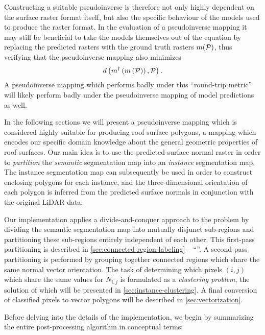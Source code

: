 Constructing a suitable pseudoinverse is therefore not only highly dependent on the surface raster format itself, but also the specific behaviour of the models used to produce the raster format.
In the evaluation of a pseudoinverse mapping it may still be beneficial to take the models themselves out of the equation by replacing the predicted rasters with the ground truth rasters $m(\mathcal{P})$, thus verifying that the pseudoinverse mapping also minimizes
\begin{equation*}
  d\left(
    m^{\dagger}\left(m\left(\mathcal{P}\right)\right),
    \mathcal{P}
  \right).
\end{equation*}
A pseudoinverse mapping which performs badly under this \enquote{round-trip metric} will likely perform badly under the pseudoinverse mapping of model predictions as well.
\newpage

In the following sections we will present a pseudoinverse mapping which is considered highly suitable for producing roof surface polygons, a mapping which encodes our specific domain knowledge about the general geometric properties of roof surfaces.
Our main idea is to use the predicted surface normal raster in order to \textit{partition} the \textit{semantic} segmentation map into an \textit{instance} segmentation map.
The instance segmentation map can subsequently be used in order to construct enclosing polygons for each instance, and the three-dimensional orientation of each polygon is inferred from the predicted surface normals in conjunction with the original LiDAR data.

Our implementation applies a divide-and-conquer approach to the problem by dividing the semantic segmentation map into mutually disjunct sub-regions and partitioning these sub-regions entirely independent of each other.
This first-pass partitioning is described in \cref{sec:connected-region-labeling} -- \enquote{}.
A second-pass partitioning is performed by grouping together connected regions which share the same normal vector orientation.
The task of determining which pixels $(i, j)$ which share the same values for $N_{i, j}$ is formulated as a \textit{clustering problem}, the solution of which will be presented in \cref{sec:instance-clustering}.
A final conversion of classified pixels to vector polygons will be described in \cref{sec:vectorization}.

Before delving into the details of the implementation, we begin by summarizing the entire post-processing algorithm in conceptual terms:

